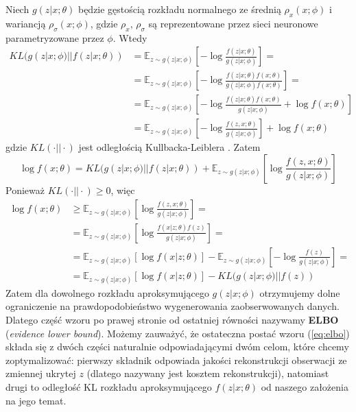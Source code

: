 \documentclass{iithesis}
\begin{document}
Niech $g(z|x; \theta)$ będzie gęstością
rozkładu normalnego ze średnią $\rho_x(x; \phi)$ i wariancją $\rho_{\sigma}(x; \phi)$,
gdzie $\rho_x,\,\rho_{\sigma}$ są reprezentowane przez sieci neuronowe
parametryzowane przez $\phi$. Wtedy
\begin{equation}
\begin{split}
KL(g(z|x;\phi) || f(z|x;\theta)) &= \mathbb{E}_{z\sim g(z|x;\phi)}\left[
-\log\frac{f(z|x;\theta)}{g(z|x;\phi)}\right]= \\
&=\mathbb{E}_{z\sim g(z|x;\phi)}\left[-\log\frac{f(z|x;\theta)f(x;\theta)}{g(z|x;\phi)f(x;\theta)}\right]= \\
&=\mathbb{E}_{z\sim g(z|x;\phi)}\left[-\log\frac{f(z|x;\theta)f(x;\theta)}{g(z|x;\phi)}+\log f(x;\theta)\right] \\
&=\mathbb{E}_{z\sim g(z|x;\phi)}\left[-\log\frac{f(z,x;\theta)}{g(z|x;\phi)}\right] +\log f(x;\theta)
\end{split}
\end{equation}
gdzie $KL(\cdotp || \cdotp)$ jest odległością Kullbacka-Leiblera \cite{kl-cost}.
Zatem
\begin{equation}
\log f(x;\theta) = KL(g(z|x;\phi) || f(z|x;\theta)) + \mathbb{E}_{z\sim g(z|x;\phi)}\left[\log\frac{f(z,x;\theta)}{g(z|x;\phi)}\right]
\end{equation}
Ponieważ $KL(\cdotp || \cdotp) \geq 0$, więc
\begin{equation}
\begin{split}
\log f(x;\theta)  &\geq \mathbb{E}_{z\sim g(z|x;\phi)}\left[\log\frac{f(z,x;\theta)}{g(z|x;\phi)}\right] = \\
&= \mathbb{E}_{z\sim g(z|x;\phi)}\left[\log\frac{f(x|z;\theta)f(z)}{g(z|x;\phi)}\right] = \\
&=\mathbb{E}_{z\sim g(z|x;\phi)}\left[\log f(x|z;\theta)\right] - \mathbb{E}_{z\sim g(z|x;\phi)}\left[-\log\frac{f(z)}{g(z|x;\phi)}\right] =\\
&=\mathbb{E}_{z\sim g(z|x;\phi)}\left[\log f(x|z;\theta)\right] - KL(g(z|x;\phi) || f(z))
\end{split}
\label{eq:elbo}
\end{equation}
Zatem dla dowolnego rozkładu aproksymującego $g(z|x;\phi)$ otrzymujemy dolne
ograniczenie na prawdopodobieństwo wygenerowania zaobserwowanych danych.
Dlatego część wzoru po prawej stronie od ostatniej równości
nazywamy \textbf{ELBO} (\textit{evidence lower bound}). Możemy zauważyć, że ostateczna
postać wzoru (\ref{eq:elbo}) składa się z dwóch części naturalnie odpowiadającymi dwóm
celom, które chcemy zoptymalizować: pierwszy składnik odpowiada
jakości rekonstrukcji obserwacji ze zmiennej ukrytej $z$
(dlatego nazywany jest kosztem rekonstrukcji),
natomiast drugi to odległość KL rozkładu aproksymującego
$f(z|x;\theta)$ od naszego założenia na jego temat.
\end{document}
